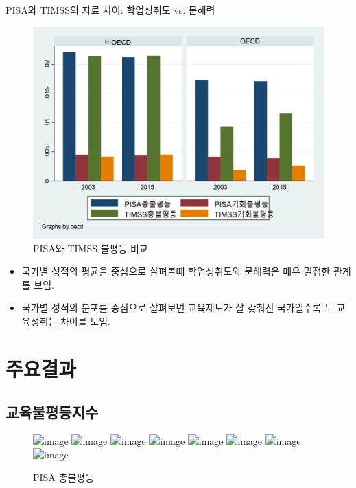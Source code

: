 \documentclass[handout, 10pt]{beamer}
\begin{document}
\begin{frame}{PISA와 TIMSS의 자료 차이: 학업성취도 vs. 문해력}
    \begin{figure}[htpb]
        \begin{center}
            \includegraphics[scale=0.1]{fig/bar_pntcompare.png}
            \caption{PISA와 TIMSS 불평등 비교}
        \end{center}
    \end{figure}
    \begin{itemize}
        \item 국가별 성적의 평균을 중심으로 살펴볼때 학업성취도와 문해력은 매우 밀접한 관계를 보임.
        \item 국가별 성적의 분포를 중심으로 살펴보면 교육제도가 잘 갖춰진 국가일수록 두 교육성취는 차이를 보임. 
    \end{itemize}
\end{frame}

\section{주요결과}
\subsection{교육불평등지수}
\begin{frame}
    \begin{figure}[htpb]
        \begin{center}
            \includegraphics<1| handout:1>[scale=0.15]{fig/map_bjtpisa_mean.png}
            \includegraphics<2| handout:0>[scale=0.15]{fig/map_bjtpisa_2000.png}
            \includegraphics<3| handout:0>[scale=0.15]{fig/map_bjtpisa_2003.png}
            \includegraphics<4| handout:0>[scale=0.15]{fig/map_bjtpisa_2006.png}
            \includegraphics<5| handout:0>[scale=0.15]{fig/map_bjtpisa_2009.png}
            \includegraphics<6| handout:0>[scale=0.15]{fig/map_bjtpisa_2012.png}
            \includegraphics<7| handout:0>[scale=0.15]{fig/map_bjtpisa_2015.png}
            \includegraphics<8| handout:0>[scale=0.15]{fig/map_bjtpisa_2018.png}
            \caption{PISA 총불평등}
        \end{center}
    \end{figure}
\end{frame}
\end{document}
